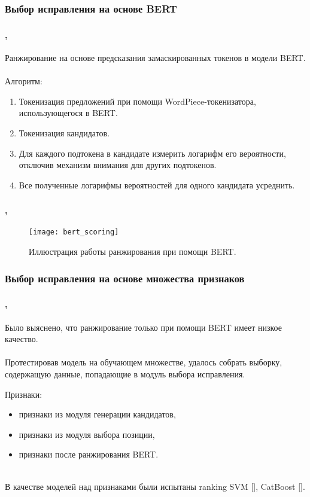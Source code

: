 \documentclass[t, aspectratio=169]{beamer}  %
\begin{document}
\subsubsection{Выбор исправления на основе BERT}
\begin{frame}
	\frametitle{\insertsection} 
	\framesubtitle{\insertsubsection, \insertsubsubsection}
	Ранжирование на основе предсказания замаскированных токенов в модели BERT. \\~\\
	
	Алгоритм:
	\begin{enumerate}
		\item Токенизация предложений при помощи WordPiece-токенизатора, использующегося в BERT.
		\item Токенизация кандидатов.
		\item Для каждого подтокена в кандидате измерить логарифм его вероятности, отключив механизм внимания для других подтокенов.
		\item Все полученные логарифмы вероятностей для одного кандидата усреднить.
	\end{enumerate}
\end{frame}

\begin{frame}
	\frametitle{\insertsection} 
	\framesubtitle{\insertsubsection, \insertsubsubsection}
	\begin{figure}[!h]
		\begin{center}
			\texttt{[image: bert\_scoring]}
			\caption{Иллюстрация работы ранжирования при помощи BERT.}
			\label{ris:bert_scoring}
		\end{center}
	\end{figure}
\end{frame}

\subsubsection{Выбор исправления на основе множества признаков}
\begin{frame}
	\frametitle{\insertsection} 
	\framesubtitle{\insertsubsection, \insertsubsubsection}
		Было выяснено, что ранжирование только при помощи BERT имеет низкое качество. \\~\\
		
		Протестировав модель на обучающем множестве, удалось собрать выборку, содержащую данные, попадающие в модуль выбора исправления. 
		
		Признаки:
		\begin{itemize}
			\item признаки из модуля генерации кандидатов,
			\item признаки из модуля выбора позиции,
			\item признаки после ранжирования BERT. \\~\\
		\end{itemize}
		
		В качестве моделей над признаками были испытаны ranking SVM [\textcite{Joachims2002}], CatBoost [\textcite{Dorogush2018}].

\end{frame}
\end{document}
